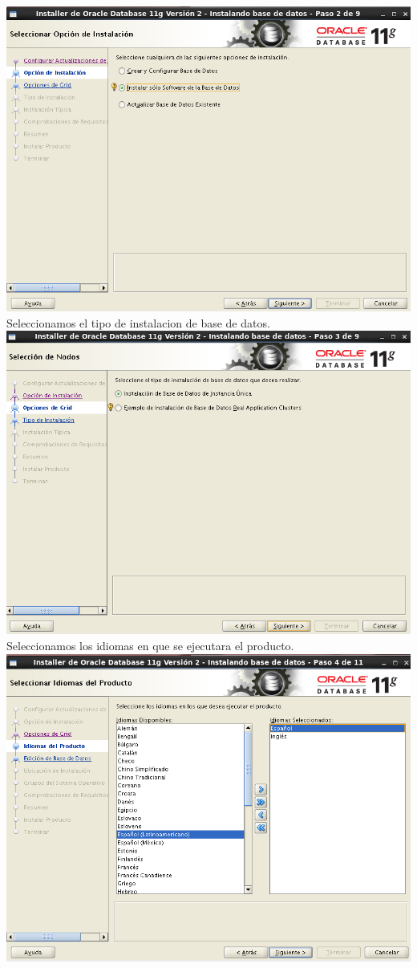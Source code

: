 \documentclass[a4paper,openright,12pt]{book}
\begin{document}
\begin{center}
\includegraphics[width=15cm]{./oracle linux/13.png}
Seleccionamos el tipo de instalacion de base de datos.\\
\includegraphics[width=15cm]{./oracle linux/14.png}
Seleccionamos los idiomas en que se ejecutara el producto.\\
\includegraphics[width=15cm]{./oracle linux/15.png}

\end{center}
\end{document}
